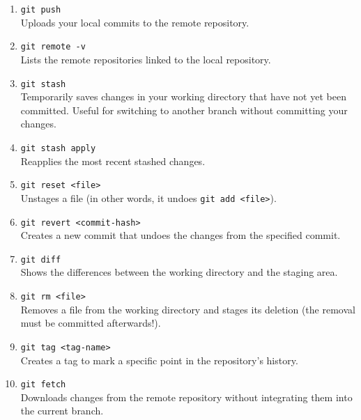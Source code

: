 \documentclass[12pt]{article}
\begin{document}
\begin{enumerate}
  \item \texttt{git push} \\
    Uploads your local commits to the remote repository.

  \item \texttt{git remote -v} \\
    Lists the remote repositories linked to the local repository.

  \item \texttt{git stash} \\
    Temporarily saves changes in your working directory that have not yet
    been committed. Useful for switching to another branch without
    committing your changes.

  \item \texttt{git stash apply} \\
    Reapplies the most recent stashed changes.

  \item \texttt{git reset <file>} \\
    Unstages a file (in other words, it undoes \texttt{git add <file>}).

  \item \texttt{git revert <commit-hash>} \\
    Creates a new commit that undoes the changes from the specified commit.

  \item \texttt{git diff} \\
    Shows the differences between the working directory and the staging
    area.

  \item \texttt{git rm <file>} \\
    Removes a file from the working directory and stages its deletion (the
    removal must be committed afterwards!).

  \item \texttt{git tag <tag-name>} \\
    Creates a tag to mark a specific point in the repository's history.

  \item \texttt{git fetch} \\
    Downloads changes from the remote repository without integrating them
    into the current branch.

\end{enumerate}

\end{document}
